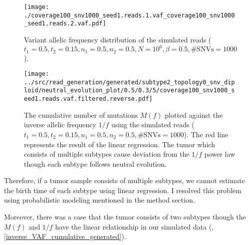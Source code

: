 \documentclass{article}
\begin{document}
\begin{figure}[H]
 \begin{minipage}[c]{0.47\hsize}
 \begin{center}
  \texttt{[image: ./coverage100\_snv1000\_seed1.reads.1.vaf\_coverage100\_snv1000\_seed1.reads.2.vaf.pdf]}
 \end{center}
    \caption{
  Variant allelic frequency distribution of the simulated reads ($t_1 = 0.5, t_2=0.15, n_1=0.5, n_2=0.5, N=10^6, \beta=0.5, \text{\#SNVs}=1000$).
  }\label{simulated_vaf}
\end{minipage}
 \hspace{1truecm}
\begin{minipage}[c]{0.47\hsize}
 \begin{center}
  \texttt{[image: ../src/read\_generation/generated/subtype2\_topology0\_snv\_diploid/neutral\_evolution\_plot/0.5/0.3/5/coverage100\_snv1000\_seed1.reads.vaf.filtered.reverse.pdf]}
 \end{center}
   \caption{
  The cumulative number of mutations $M(f)$ plotted against the inverse allelic frequency $1/f$
  using the simulated reads ($t_1 = 0.5, t_2=0.15, n_1=0.5, n_2=0.5, \text{\#SNVs}=1000$).
  The red line represents the result of the linear regression.
 The tumor which consists of multiple subtypes cause deviation from the $1/f$ power law though each subtype follows neutral evolution.
  }
 \label{simulated_linear_regression}
\end{minipage}
\end{figure}

Therefore, if a tumor sample consists of multiple subtypes, we cannot estimate the birth time of each subtype using linear regression.
I resolved this problem using probabilistic modeling mentioned in the method section.

Moreover, there was a case that the tumor consists of two subtypes though the $M(f)$ and $1/f$ have the linear relationship in our simulated data (, \ref{inverse_VAF_cumulative_generated}).
\end{document}
